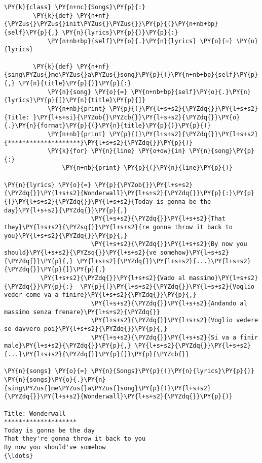 \begin{Answer}
\begin{tcolorbox}[size=fbox, boxrule=1pt, colback=cellbackground, colframe=cellborder]
\begin{Verbatim}[commandchars=\\\{\}]
\PY{k}{class} \PY{n+nc}{Songs}\PY{p}{:}
        \PY{k}{def} \PY{n+nf}{\PYZus{}\PYZus{}init\PYZus{}\PYZus{}}\PY{p}{(}\PY{n+nb+bp}{self}\PY{p}{,} \PY{n}{lyrics}\PY{p}{)}\PY{p}{:}
            \PY{n+nb+bp}{self}\PY{o}{.}\PY{n}{lyrics} \PY{o}{=} \PY{n}{lyrics}
    
        \PY{k}{def} \PY{n+nf}{sing\PYZus{}me\PYZus{}a\PYZus{}song}\PY{p}{(}\PY{n+nb+bp}{self}\PY{p}{,} \PY{n}{title}\PY{p}{)}\PY{p}{:}
            \PY{n}{song} \PY{o}{=} \PY{n+nb+bp}{self}\PY{o}{.}\PY{n}{lyrics}\PY{p}{[}\PY{n}{title}\PY{p}{]}
            \PY{n+nb}{print} \PY{p}{(}\PY{l+s+s2}{\PYZdq{}}\PY{l+s+s2}{Title: }\PY{l+s+si}{\PYZob{}\PYZcb{}}\PY{l+s+s2}{\PYZdq{}}\PY{o}{.}\PY{n}{format}\PY{p}{(}\PY{n}{title}\PY{p}{)}\PY{p}{)}
            \PY{n+nb}{print} \PY{p}{(}\PY{l+s+s2}{\PYZdq{}}\PY{l+s+s2}{********************}\PY{l+s+s2}{\PYZdq{}}\PY{p}{)}
            \PY{k}{for} \PY{n}{line} \PY{o+ow}{in} \PY{n}{song}\PY{p}{:}
                \PY{n+nb}{print} \PY{p}{(}\PY{n}{line}\PY{p}{)}
    
\PY{n}{lyrics} \PY{o}{=} \PY{p}{\PYZob{}}\PY{l+s+s2}{\PYZdq{}}\PY{l+s+s2}{Wonderwall}\PY{l+s+s2}{\PYZdq{}}\PY{p}{:}\PY{p}{[}\PY{l+s+s2}{\PYZdq{}}\PY{l+s+s2}{Today is gonna be the day}\PY{l+s+s2}{\PYZdq{}}\PY{p}{,}
                        \PY{l+s+s2}{\PYZdq{}}\PY{l+s+s2}{That they}\PY{l+s+s2}{\PYZsq{}}\PY{l+s+s2}{re gonna throw it back to you}\PY{l+s+s2}{\PYZdq{}}\PY{p}{,}
                        \PY{l+s+s2}{\PYZdq{}}\PY{l+s+s2}{By now you should}\PY{l+s+s2}{\PYZsq{}}\PY{l+s+s2}{ve somehow}\PY{l+s+s2}{\PYZdq{}}\PY{p}{,} \PY{l+s+s2}{\PYZdq{}}\PY{l+s+s2}{...}\PY{l+s+s2}{\PYZdq{}}\PY{p}{]}\PY{p}{,} 
          \PY{l+s+s2}{\PYZdq{}}\PY{l+s+s2}{Vado al massimo}\PY{l+s+s2}{\PYZdq{}}\PY{p}{:}  \PY{p}{[}\PY{l+s+s2}{\PYZdq{}}\PY{l+s+s2}{Voglio veder come va a finire}\PY{l+s+s2}{\PYZdq{}}\PY{p}{,}
                        \PY{l+s+s2}{\PYZdq{}}\PY{l+s+s2}{Andando al massimo senza frenare}\PY{l+s+s2}{\PYZdq{}}
                        \PY{l+s+s2}{\PYZdq{}}\PY{l+s+s2}{Voglio vedere se davvero poi}\PY{l+s+s2}{\PYZdq{}}\PY{p}{,}
                        \PY{l+s+s2}{\PYZdq{}}\PY{l+s+s2}{Si va a finir male}\PY{l+s+s2}{\PYZdq{}}\PY{p}{,} \PY{l+s+s2}{\PYZdq{}}\PY{l+s+s2}{...}\PY{l+s+s2}{\PYZdq{}}\PY{p}{]}\PY{p}{\PYZcb{}}

\PY{n}{songs} \PY{o}{=} \PY{n}{Songs}\PY{p}{(}\PY{n}{lyrics}\PY{p}{)}
\PY{n}{songs}\PY{o}{.}\PY{n}{sing\PYZus{}me\PYZus{}a\PYZus{}song}\PY{p}{(}\PY{l+s+s2}{\PYZdq{}}\PY{l+s+s2}{Wonderwall}\PY{l+s+s2}{\PYZdq{}}\PY{p}{)}

Title: Wonderwall
********************
Today is gonna be the day
That they're gonna throw it back to you
By now you should've somehow
{\ldots}
\end{Verbatim}
\end{tcolorbox}
\end{Answer}

